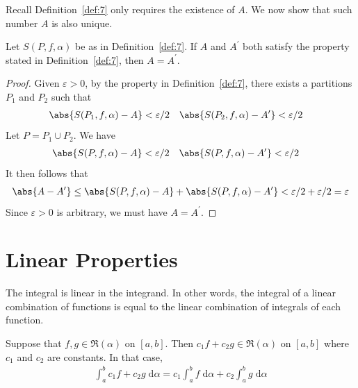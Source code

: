 \documentclass[thmcnt=section, 12pt]{elegantbook}
\begin{document}

\par Recall Definition~\ref{def:7} only requires the existence of $A$. We now show that such number $A$ is also unique.

\begin{proposition} \label{pro:7}
    Let $S(P,f,\alpha)$ be as in Definition~\ref{def:7}. If $A$ and $A^\prime$ both satisfy the property stated in Definition~\ref{def:7}, then $A = A^\prime$.
\end{proposition}

\begin{proof}
    Given $\varepsilon > 0$, by the property in Definition~\ref{def:7}, there exists a partitions $P_1$ and $P_2$ such that  
    \begin{align*}
        \abs{S(P_1,f,\alpha) - A} &< \varepsilon / 2 &
        \abs{S(P_2,f,\alpha) - A^\prime} &< \varepsilon / 2
    \end{align*}
    Let $P = P_1 \cup P_2$. We have
    \begin{align*}
        \abs{S(P,f,\alpha) - A} &< \varepsilon / 2 &
        \abs{S(P,f,\alpha) - A^\prime} &< \varepsilon / 2
    \end{align*}
    It then follows that
    \begin{align*}
        \abs{A - A^\prime}
        \leq \abs{S(P,f,\alpha) - A} +
        \abs{S(P,f,\alpha) - A^\prime} 
        < \varepsilon / 2 + \varepsilon / 2
        = \varepsilon
    \end{align*}
    Since $\varepsilon > 0$ is arbitrary, we must have $A = A^\prime$.
\end{proof}


\section{Linear Properties}


\par The integral is linear in the integrand. In other words, the integral of a linear combination of functions is equal to the linear combination of integrals of each function.

\begin{theorem} \label{thm:40}
    Suppose that $f, g \in \mathfrak{R}(\alpha)$ on $[a,b]$. Then $c_1 f + c_2 g \in \mathfrak{R}(\alpha)$ on $[a,b]$ where $c_1$ and $c_2$ are constants. In that case, 
    \begin{align*}
        \int_a^b c_1 f + c_2 g \; \mathrm{d}\alpha
        = c_1 \int_a^b f \; \mathrm{d}\alpha
        + c_2 \int_a^b g \; \mathrm{d}\alpha
    \end{align*}
\end{theorem}
\end{document}
